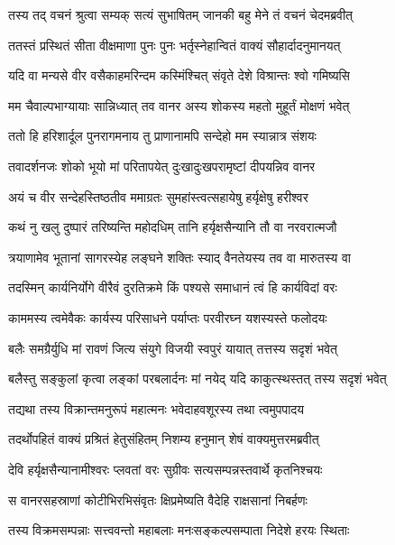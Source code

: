 \twolineshloka
{तस्य तद् वचनं श्रुत्वा सम्यक् सत्यं सुभाषितम्}
{जानकी बहु मेने तं वचनं चेदमब्रवीत्} %

\twolineshloka
{ततस्तं प्रस्थितं सीता वीक्षमाणा पुनः पुनः}
{भर्तृस्नेहान्वितं वाक्यं सौहार्दादनुमानयत्} %

\twolineshloka
{यदि वा मन्यसे वीर वसैकाहमरिन्दम}
{कस्मिंश्चित् संवृते देशे विश्रान्तः श्वो गमिष्यसि} %

\twolineshloka
{मम चैवाल्पभाग्यायाः सान्निध्यात् तव वानर}
{अस्य शोकस्य महतो मुहूर्तं मोक्षणं भवेत्} %

\twolineshloka
{ततो हि हरिशार्दूल पुनरागमनाय तु}
{प्राणानामपि सन्देहो मम स्यान्नात्र संशयः} %

\twolineshloka
{तवादर्शनजः शोको भूयो मां परितापयेत्}
{दुःखादुःखपरामृष्टां दीपयन्निव वानर} %

\twolineshloka
{अयं च वीर सन्देहस्तिष्ठतीव ममाग्रतः}
{सुमहांस्त्वत्सहायेषु हर्यृक्षेषु हरीश्वर} %

\twolineshloka
{कथं नु खलु दुष्पारं तरिष्यन्ति महोदधिम्}
{तानि हर्यृक्षसैन्यानि तौ वा नरवरात्मजौ} %

\twolineshloka
{त्रयाणामेव भूतानां सागरस्येह लङ्घने}
{शक्तिः स्याद् वैनतेयस्य तव वा मारुतस्य वा} %

\twolineshloka
{तदस्मिन् कार्यनिर्योगे वीरैवं दुरतिक्रमे}
{किं पश्यसे समाधानं त्वं हि कार्यविदां वरः} %

\twolineshloka
{काममस्य त्वमेवैकः कार्यस्य परिसाधने}
{पर्याप्तः परवीरघ्न यशस्यस्ते फलोदयः} %

\twolineshloka
{बलैः समग्रैर्युधि मां रावणं जित्य संयुगे}
{विजयी स्वपुरं यायात् तत्तस्य सदृशं भवेत्} %

\twolineshloka
{बलैस्तु सङ्कुलां कृत्वा लङ्कां परबलार्दनः}
{मां नयेद् यदि काकुत्स्थस्तत् तस्य सदृशं भवेत्} %

\twolineshloka
{तद्यथा तस्य विक्रान्तमनुरूपं महात्मनः}
{भवेदाहवशूरस्य तथा त्वमुपपादय} %

\twolineshloka
{तदर्थोपहितं वाक्यं प्रश्रितं हेतुसंहितम्}
{निशम्य हनुमान् शेषं वाक्यमुत्तरमब्रवीत्} %

\twolineshloka
{देवि हर्यृक्षसैन्यानामीश्वरः प्लवतां वरः}
{सुग्रीवः सत्यसम्पन्नस्तवार्थे कृतनिश्चयः} %

\twolineshloka
{स वानरसहस्राणां कोटीभिरभिसंवृतः}
{क्षिप्रमेष्यति वैदेहि राक्षसानां निबर्हणः} %

\twolineshloka
{तस्य विक्रमसम्पन्नाः सत्त्ववन्तो महाबलाः}
{मनःसङ्कल्पसम्पाता निदेशे हरयः स्थिताः} %


